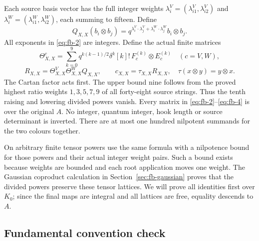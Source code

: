 Each source basis vector has the full integer weights
\(\lambda_i^V=(\lambda_{i1}^V,\lambda_{i2}^V)\) and
\(\lambda_i^W=(\lambda_{i1}^W,\lambda_{i2}^W)\), each summing to fifteen.
Define
\begin{equation}\tag{FB2}\label{eq:fb-2}
Q_{X,X}(b_i\otimes b_j)
 =q^{\lambda_i^V\cdot\lambda_j^V+\lambda_i^W\cdot\lambda_j^W}
 b_i\otimes b_j.
\end{equation}
All exponents in \eqref{eq:fb-2} are integers. Define the actual finite matrices
\begin{equation}\tag{FB3}\label{eq:fb-3}
\Theta^c_{X,X}=\sum_{k=0}^{9}
 q^{k(k-1)/2}\delta^k[k]!\,F_c^{(k)}\otimes E_c^{(k)}
 \quad(c=V,W),
\end{equation}
\begin{equation}\tag{FB4}\label{eq:fb-4}
R_{X,X}=\Theta^V_{X,X}\Theta^W_{X,X}Q_{X,X},
 \qquad c_{X,X}=\tau_{X,X}R_{X,X},
 \quad \tau(x\otimes y)=y\otimes x.
\end{equation}
The Cartan factor acts first. The upper bound nine follows from the
proved highest ratio weights \(1,3,5,7,9\) of all forty-eight source
strings. Thus the tenth raising and lowering divided powers vanish.
Every matrix in \eqref{eq:fb-2}–\eqref{eq:fb-4} is over the original \(A\). No integer, quantum
integer, hook length or source determinant is inverted. There are at
most one hundred nilpotent summands for the two colours together.

On arbitrary finite tensor powers use the same formula with a nilpotence
bound for those powers and their actual integer weight pairs. Such a
bound exists because weights are bounded and each root application moves
one weight. The Gaussian coproduct calculation in Section~\ref{sec:fb-gaussian} proves that
the divided powers preserve these tensor lattices. We will prove all
identities first over \(K_0\); since the final maps are integral and all
lattices are free, equality descends to \(A\).

\subsection{Fundamental convention check}
\label{sec:fb-fundamental}


